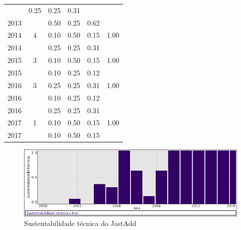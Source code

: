 \begin{table}[H]
\begin{tabular}{| l | c | c | c | c | c |}
          &
          0.25
          &
          0.25
          &
          0.31
          &
          \\
            2013
          &
          
          &
          0.50
          &
          0.25
          &
          0.62
          &
          \\
\hline
            2014
          &
          4
          &
          0.10
          &
          0.50
          &
          0.15
          &
            {\color{blue} 1.00}
          \\
            2014
          &
          
          &
          0.25
          &
          0.25
          &
          0.31
          &
          \\
\hline
            2015
          &
          3
          &
          0.10
          &
          0.50
          &
          0.15
          &
            {\color{blue} 1.00}
          \\
            2015
          &
          
          &
          0.10
          &
          0.25
          &
          0.12
          &
          \\
\hline
            2016
          &
          3
          &
          0.25
          &
          0.25
          &
          0.31
          &
            {\color{blue} 1.00}
          \\
            2016
          &
          
          &
          0.10
          &
          0.25
          &
          0.12
          &
          \\
            2016
          &
          
          &
          0.25
          &
          0.25
          &
          0.31
          &
          \\
\hline
            2017
          &
          1
          &
          0.10
          &
          0.50
          &
          0.15
          &
            {\color{blue} 1.00}
          \\
            2017
          &
          
          &
          0.10
          &
          0.50
          &
          0.15
          &
          \\
\hline
\end{tabular}
\end{table}

\begin{figure}[h]
  \center
  \includegraphics[scale=0.50]{result-documents/charts/jastadd.png}
  \caption{Sustentabilidade técnica do JastAdd}
\end{figure}


